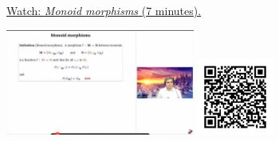 
\begin{minipage}{10cm}
    \href{https://act4e-spring21.netlify.app/videos/spring2021-morphisms:morphisms:monoid-morphisms.html}{Watch: \emph{Monoid morphisms} (7 minutes).}
        
    \href{https://act4e-spring21.netlify.app/videos/spring2021-morphisms:morphisms:monoid-morphisms.html}{\includegraphics[height=3.5cm]{spring2021-morphisms:morphisms:monoid-morphisms/thumbnails.jpg}}
    \href{https://act4e-spring21.netlify.app/videos/spring2021-morphisms:morphisms:monoid-morphisms.html}{\includegraphics[height=2.5cm]{spring2021-morphisms:morphisms:monoid-morphisms/qrcode.png}}
\end{minipage}
